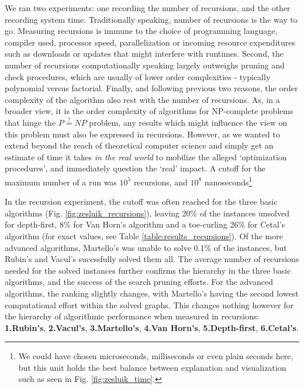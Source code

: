 \documentclass[10pt,conference,compsocconf]{IEEEtran}
\begin{document}
We ran two experiments: one recording the number of recursions, and the other recording system time. Traditionally speaking, number of recursions is the way to go. Measuring recursions is immune to the choice of programming language, compiler used, processor speed, parallelization or incoming resource expenditures such as downloads or updates that might interfere with runtimes. Second, the number of recursions computationally speaking largely outweighs pruning and check procedures, which are usually of lower order complexities - typically polynomial versus factorial. Finally, and following previous two reasons, the order complexity of the algorithm also rest with the number of recursions. As, in a broader view, it is the order complexity of algorithms for NP-complete problems that hinge the $P\stackrel{?}{=}NP$ problem, any results which might influence the view on this problem must also be expressed in recursions. However, as we wanted to extend beyond the reach of theoretical computer science and simply get an estimate of time it takes \textit{in the real world} to mobilize the alleged `optimization procedures', and immediately question the `real' impact. A cutoff for the maximum number of a run was $10^5$ recursions, and $10^8$ nanoseconds\footnote{We could have chosen microseconds, milliseconds or even plain seconds here, but this unit holds the best balance between explanation and visualization such as seen in Fig. \ref{fig:zesluik_time}.}

In the recursion experiment, the cutoff was often reached for the three basic algorithms (Fig. \ref{fig:zesluik_recursions}), leaving 20\% of the instances unsolved for depth-first, 8\% for Van Horn's algorithm and a toe-curling 26\% for Cetal's algorithm (for exact values, see Table \ref{table:results_recursions}). Of the more advanced algorithms, Martello's was unable to solve 0.1\% of the instances, but Rubin's and Vacul's sucessfully solved them all. The average number of recursions needed for the solved instances further confirms the hierarchy in the three basic algorithms, and the success of the search pruning efforts. For the advanced algorithms, the ranking slightly changes, with Martello's having the second lowest computational effort within the solved graphs. This changes nothing however for the hierarchy of algorithmic performance when measured in recursions: \textbf{1.Rubin's}, \textbf{2.Vacul's}, \textbf{3.Martello's}, \textbf{4.Van Horn's}, \textbf{5.Depth-first}, \textbf{6.Cetal's}.
\end{document}
